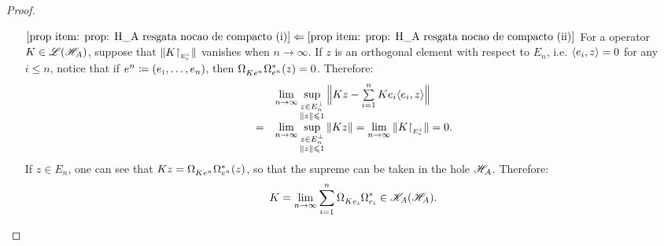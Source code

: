 \begin{proposicao}
\begin{proof}
\begin{itemize}
    \item[$\ref{prop item: prop: H_A resgata nocao de compacto (i)} \Leftarrow \ref{prop item: prop: H_A resgata nocao de compacto (ii)}$] For a operator $K \in \mathscr L(\mathscr H_A)$, suppose that $\|K \sub\restrita{E_n^{\perp}}\|$ vanishes when $n\to \infty$. If $z$ is an orthogonal element with respect to $E_n$, i.e. $\langle {e_i},{z}\rangle =0$ for any $i \leq n$, notice that if $e^n\coloneqq (\sub e1, \ldots, e_n)$, then $\Omega_{Ke^n}^{\vphantom{*}}\Omega_{e^n}^*(z)= 0$. Therefore:
    \begin{equation*}
        \begin{array}{rl}
            & \lim\limits_{n\to \infty} \sup\limits_{\substack{ z \in E_n^{\perp} \\ \|z\| \leq 1}} \Big\| Kz - \sum\limits_{i=1}^n Ke_i \inner{e_i}z\Big\|\\
            = &  
        \lim\limits_{n\to \infty} \sup\limits_{\substack{ z \in E_n^{\perp} \\ \|z\| \leq 1}} \| Kz \| = \lim\limits_{n\to \infty} \|K \sub\restrita{E_n^{\perp}}\|= 0.
        \end{array}
    \end{equation*}
    If $z \in E_n$, one can see that $Kz = \Omega_{Ke^n}^{\vphantom{*}}\Omega_{e^n}^*(z)$, so that the supreme can be taken in the hole $\mathscr H_A$. Therefore:
    \begin{equation*}
        K = \lim_{n\to \infty} \sum_{i=1}^n \Omega_{Ke_i}^{\vphantom{*}}\Omega_{e_i}^* \in \mathscr K_A(\mathscr H_A). \qedhere 
    \end{equation*}
\end{itemize}
\end{proof}
\end{proposicao}



